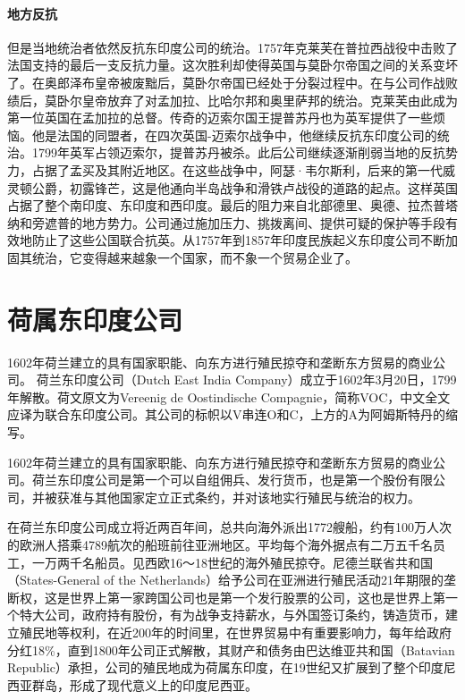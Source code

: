 \documentclass{ctexbook}
\begin{document}
\subsubsection{地方反抗}
但是当地统治者依然反抗东印度公司的统治。1757年克莱芙在普拉西战役中击败了法国支持的最后一支反抗力量。这次胜利却使得英国与莫卧尔帝国之间的关系变坏了。在奥郎泽布皇帝被废黜后，莫卧尔帝国已经处于分裂过程中。在与公司作战败绩后，莫卧尔皇帝放弃了对孟加拉、比哈尔邦和奥里萨邦的统治。克莱芙由此成为第一位英国在孟加拉的总督。传奇的迈索尔国王提普苏丹也为英军提供了一些烦恼。他是法国的同盟者，在四次英国-迈索尔战争中，他继续反抗东印度公司的统治。1799年英军占领迈索尔，提普苏丹被杀。此后公司继续逐渐削弱当地的反抗势力，占据了孟买及其附近地区。在这些战争中，阿瑟·韦尔斯利，后来的第一代威灵顿公爵，初露锋芒，这是他通向半岛战争和滑铁卢战役的道路的起点。这样英国占据了整个南印度、东印度和西印度。最后的阻力来自北部德里、奥德、拉杰普塔纳和旁遮普的地方势力。公司通过施加压力、挑拨离间、提供可疑的保护等手段有效地防止了这些公国联合抗英。从1757年到1857年印度民族起义东印度公司不断加固其统治，它变得越来越象一个国家，而不象一个贸易企业了。

\chapter{荷属东印度公司}
1602年荷兰建立的具有国家职能、向东方进行殖民掠夺和垄断东方贸易的商业公司。
荷兰东印度公司（Dutch East India Company）成立于1602年3月20日，1799年解散。荷文原文为Vereenig de Oostindische Compagnie，简称VOC，中文全文应译为联合东印度公司。其公司的标帜以V串连O和C，上方的A为阿姆斯特丹的缩写。

1602年荷兰建立的具有国家职能、向东方进行殖民掠夺和垄断东方贸易的商业公司。荷兰东印度公司是第一个可以自组佣兵、发行货币，也是第一个股份有限公司，并被获准与其他国家定立正式条约，并对该地实行殖民与统治的权力。

\begin{figwindow}
    在荷兰东印度公司成立将近两百年间，总共向海外派出1772艘船，约有100万人次的欧洲人搭乘4789航次的船班前往亚洲地区。平均每个海外据点有二万五千名员工，一万两千名船员。见西欧16～18世纪的海外殖民掠夺。尼德兰联省共和国（States-General of the Netherlands）给予公司在亚洲进行殖民活动21年期限的垄断权，这是世界上第一家跨国公司也是第一个发行股票的公司，这也是世界上第一个特大公司，政府持有股份，有为战争支持薪水，与外国签订条约，铸造货币，建立殖民地等权利，在近200年的时间里，在世界贸易中有重要影响力，每年给政府分红18\%，直到1800年公司正式解散，其财产和债务由巴达维亚共和国（Batavian Republic）承担，公司的殖民地成为荷属东印度，在19世纪又扩展到了整个印度尼西亚群岛，形成了现代意义上的印度尼西亚。
\end{figwindow}
\end{document}
